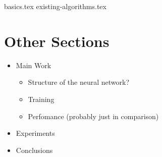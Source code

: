 \documentclass[a4paper]{article}
\begin{document}
{basics.tex}
{existing-algorithms.tex}

\section{Other Sections}
\begin{itemize}
  \item Main Work
        \begin{itemize}
          \item Structure of the neural network?
          \item Training
          \item Perfomance (probably just in comparison)
        \end{itemize}
  \item Experiments
  \item Conclusions
\end{itemize}
\end{document}
